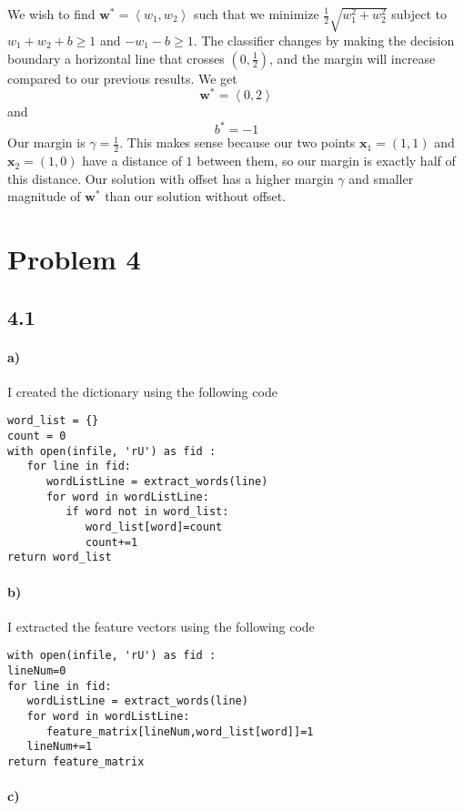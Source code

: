 \documentclass[12pt]{article}
\begin{document}
We wish to find \(\mathbf{w}^*=\left<w_1,w_2\right>\) such that we minimize \(\frac{1}{2}\sqrt{w_1^2+w_2^2}\) subject to \(w_1+w_2+b\geq 1\) and \(-w_1-b\geq 1\).
The classifier changes by making the decision boundary a horizontal line that crosses \(\left(0,\frac{1}{2}\right)\), and the margin will increase compared to our
previous results. We get
\[\mathbf{w}^*=\left<0,2\right>\]
and
\[b^*=-1\]
Our margin is \(\gamma=\frac{1}{2}\). This makes sense because our two points \(\mathbf{x}_1=(1,1)\) and \(\mathbf{x}_2=(1,0)\) have a distance of \(1\) between them,
so our margin is exactly half of this distance. Our solution with offset has a higher margin \(\gamma\) and smaller magnitude of \(\mathbf{w}^*\) than our
solution without offset.

\section*{Problem 4}

\subsection*{4.1}

\paragraph{a)}

I created the dictionary using the following code
\begin{verbatim}
word_list = {}
count = 0
with open(infile, 'rU') as fid :
   for line in fid:
      wordListLine = extract_words(line)
      for word in wordListLine:
         if word not in word_list:
            word_list[word]=count
            count+=1
return word_list
\end{verbatim}

\paragraph{b)}

I extracted the feature vectors using the following code
\begin{verbatim}
with open(infile, 'rU') as fid :
lineNum=0
for line in fid:
   wordListLine = extract_words(line)
   for word in wordListLine:
      feature_matrix[lineNum,word_list[word]]=1
   lineNum+=1
return feature_matrix
\end{verbatim}

\paragraph{c)}
\end{document}

